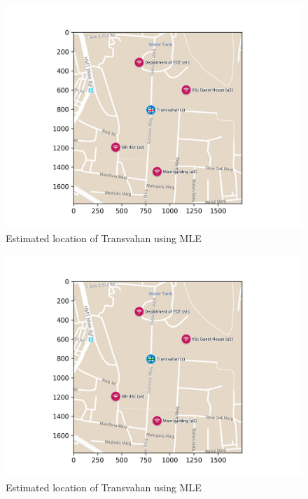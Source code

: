 \documentclass[a4 paper]{article}
\begin{document}
\vspace{6em}

\begin{figure}[h]
	\includegraphics[width=\linewidth]{../results/MLE_map_loc.png}
	\caption{Estimated location of Transvahan using MLE}
	\label{fig:MLE}
\end{figure}





\newpage
{}

\vspace{6em}

\begin{figure}[h]
	\includegraphics[width=\linewidth]{../results/BLUE_map_loc.png}
	\caption{Estimated location of Transvahan using MLE}
	\label{fig:BLUE}
\end{figure}
\end{document}
